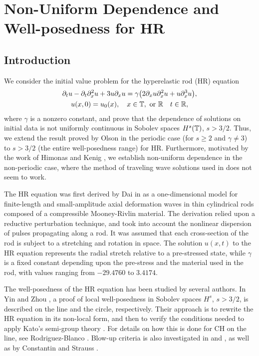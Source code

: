 \chapter{Non-Uniform Dependence and Well-posedness for 
HR}
\section{Introduction}
%
We consider the  initial value problem for
the hyperelastic rod (HR)  equation
%
%
\begin{gather}
\label{hr}
\partial_t u
-
\partial_t \partial_x^2 u
+
3u\partial_x u
=
\gamma \big (
2\partial_x u \partial_x^2 u
+
u \partial_x^3 u
\big ),
\\
\label{hr-data} u(x, 0) = u_0 (x),
\quad x \in \mathbb{T}, \ \text{or} \ \mathbb{R} \quad t \in \mathbb{R},
\end{gather}
%
%
where  $\gamma$  is a  nonzero constant,
and prove that the dependence of solutions on initial data is not uniformly 
continuous in Sobolev spaces $H^s(\mathbb{T})$, $s>3/2$.
Thus, we extend the result proved by Olson 
\cite{Olson_2006_Non-uniform-dep} in the periodic
case (for $s\ge 2$ and $\gamma \ne 3$)  to  $s>3/2$ (the entire 
well-posedness range) for HR\@. Furthermore,  motivated by the work of
Himonas  and Kenig \cite{Himonas:2009fk},
we establish non-uniform dependence
in the non-periodic case, where the method of traveling wave solutions used in  
\cite{Olson_2006_Non-uniform-dep} does not seem to work.
%
%

The HR equation was first
derived by Dai in \cite{Dai_1998_Model-equations} as a one-dimensional 
model for finite-length and
small-amplitude axial deformation waves in thin cylindrical
rods composed of a compressible Mooney-Rivlin
material. The derivation relied upon a reductive perturbation technique, 
and took into account the nonlinear dispersion of pulses propagating 
along a rod. It was assumed that each cross-section of the rod is 
subject to a stretching and rotation in space. The solution $u(x,t)$ to the 
HR equation represents the radial stretch relative
to a pre-stressed state, while $\gamma$ is a fixed constant depending upon 
the pre-stress and the material used in
the rod, with values ranging from $- 29.4760$ to $3.4174$.

%
The well-posedness of the HR equation has been studied by several authors. 
In Yin \cite{Yin_2003_On-the-Cauchy-p} and Zhou 
\cite{Zhou_2005_Local-well-pose}, a proof of local well-posedness in Sobolev 
spaces $H^s$,  $s > 3/2$, is described  on the line and the circle, respectively. 
Their approach is to rewrite the HR equation   
in its non-local form, and then to verify the conditions needed to apply 
Kato's semi-group theory \cite{Kato:1975}. 
For details on how this is done for CH on the line, see Rodriguez-Blanco 
\cite{Rodriguez-Blanco_2001_On-the-Cauchy-p}. Blow-up criteria 
is also investigated in \cite{Yin_2003_On-the-Cauchy-p} and 
\cite{Zhou_2005_Local-well-pose}, as well as by Constantin and Strauss 
\cite{Constantin_2000_Stability-of-a-}. 


